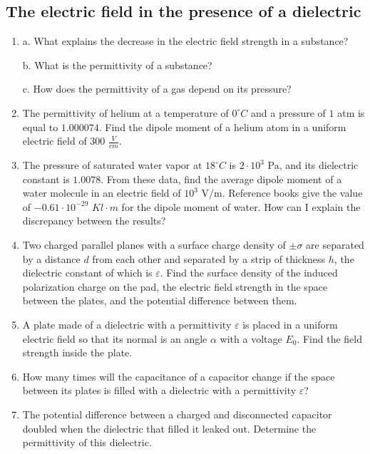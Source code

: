 \documentclass{article}
\begin{document}
\subsection{The electric field in the presence of a dielectric}
\begin{enumerate}[label=6.6.\arabic*]

\item a. What explains the decrease in the electric field strength in a substance? 

b. What is the permittivity of a substance? 

c. How does the permittivity of a gas depend on its pressure?

\item The permittivity of helium at a temperature of $0^\circ C$ and a pressure of $1$ atm is equal to $1.000074$. Find the dipole moment of a helium atom in a uniform electric field of $300$ $\frac{V}{cm}$.

\item The pressure of saturated water vapor at $18^\circ C$ is $2 \cdot 10^3$ Pa, and its dielectric constant is $1.0078$. From these data, find the average dipole moment of a water molecule in an electric field of $10^3$ V/m. Reference books give the value of $-0.61 \cdot 10^{-29}$ $Kl \cdot m$ for the dipole moment of water. How can I explain the discrepancy between the results?

\item Two charged parallel planes with a surface charge density of $\pm \sigma$ are separated by a distance $d$ from each other and separated by a strip of thickness $h$, the dielectric constant of which is $\varepsilon$. Find the surface density of the induced polarization charge on the pad, the electric field strength in the space between the plates, and the potential difference between them.

\item A plate made of a dielectric with a permittivity $\varepsilon$ is placed in a uniform electric field so that its normal is an angle $\alpha$ with a voltage $E_0$. Find the field strength inside the plate.

\item How many times will the capacitance of a capacitor change if the space between its plates is filled with a dielectric with a permittivity $\varepsilon$?

\item The potential difference between a charged and disconnected capacitor doubled when the dielectric that filled it leaked out. Determine the permittivity of this dielectric.


\end{enumerate}
\end{document}
